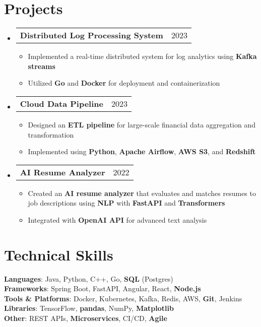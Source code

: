 \documentclass[letterpaper,11pt]{article}
\makeatletter
\newcommand{\resumeItem}[1]{
    \item\small{
            {#1 \vspace{-2pt}}
    }
}
\newcommand{\resumeProjectHeading}[2]{
    \item
    \begin{tabular*}{0.97\textwidth}{l@{\extracolsep{\fill}}r}
    \small#1 & #2 \\
    \end{tabular*}\vspace{-7pt}
}
\newcommand{\resumeSubHeadingListStart}{\begin{itemize}[leftmargin=0.15in, label={}]}
\newcommand{\resumeSubHeadingListEnd}{\end{itemize}}
\newcommand{\resumeItemListStart}{\begin{itemize}}
\newcommand{\resumeItemListEnd}{\end{itemize}\vspace{-5pt}}
\makeatother
\begin{document}
\section{Projects}
\resumeSubHeadingListStart
\resumeProjectHeading
{\textbf{Distributed Log Processing System}}{2023}
\resumeItemListStart
\resumeItem{Implemented a real-time distributed system for log analytics using \textbf{Kafka streams}}
\resumeItem{Utilized \textbf{Go} and \textbf{Docker} for deployment and containerization}
\resumeItemListEnd
\resumeProjectHeading
{\textbf{Cloud Data Pipeline}}{2023}
\resumeItemListStart
\resumeItem{Designed an \textbf{ETL pipeline} for large-scale financial data aggregation and transformation}
\resumeItem{Implemented using \textbf{Python}, \textbf{Apache Airflow}, \textbf{AWS S3}, and \textbf{Redshift}}
\resumeItemListEnd
\resumeProjectHeading
{\textbf{AI Resume Analyzer}}{2022}
\resumeItemListStart
\resumeItem{Created an \textbf{AI resume analyzer} that evaluates and matches resumes to job descriptions using \textbf{NLP} with \textbf{FastAPI} and \textbf{Transformers}}
\resumeItem{Integrated with \textbf{OpenAI API} for advanced text analysis}
\resumeItemListEnd
\resumeSubHeadingListEnd

\section{Technical Skills}
\begin{itemize}[leftmargin=0.15in, label={}]
\small{\item{
\textbf{Languages}{: Java, Python, C++, Go, \textbf{SQL} (Postgres)} \\
\textbf{Frameworks}{: Spring Boot, FastAPI, Angular, React, \textbf{Node.js}} \\
\textbf{Tools \& Platforms}{: Docker, Kubernetes, Kafka, Redis, AWS, \textbf{Git}, Jenkins} \\
\textbf{Libraries}{: TensorFlow, \textbf{pandas}, NumPy, \textbf{Matplotlib}} \\
\textbf{Other}{: REST APIs, \textbf{Microservices}, CI/CD, \textbf{Agile} }
}}
\end{itemize}
\end{document}
